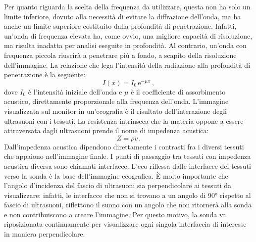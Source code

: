 \documentclass{report}
\numberwithin{equation}{section}
\numberwithin{figure}{section}
\begin{document}
Per quanto riguarda la scelta della frequenza da utilizzare, questa non ha solo un limite inferiore, dovuto alla necessità di evitare la diffrazione dell'onda, ma ha anche un limite superiore costituito dalla profondità di penetrazione. Infatti, un'onda di frequenza elevata ha, come ovvio, una migliore capacità di risoluzione, ma risulta inadatta per analisi eseguite in profondità. Al contrario, un'onda con frequenza piccola riuscirà a penetrare più a fondo, a scapito della risoluzione dell'immagine. La relazione che lega l'intensità della radiazione alla profondità di penetrazione è la seguente:
\begin{equation}
    I(x) = I_0\,\mathrm{e}^{-\mu x}\,,
    \label{mu}
\end{equation}
dove $I_0$ è l'intensità iniziale dell'onda e $\mu$ è il coefficiente di assorbimento acustico, direttamente proporzionale alla frequenza dell'onda. L’immagine visualizzata sul monitor in un'ecografia è il risultato dell'interazione degli ultrasuoni con i tessuti. La resistenza intrinseca che la materia oppone a essere attraversata dagli ultrasuoni prende il nome di impedenza acustica:
\begin{equation}
    Z = \rho v\,.
\end{equation}
Dall'impedenza acustica dipendono direttamente i contrasti fra i diversi tessuti che appaiono nell'immagine finale. I punti di passaggio tra tessuti con impedenza acustica diversa sono chiamati interfacce. L’eco riflessa dalle interfacce dei tessuti verso la sonda è la base dell'immagine ecografica. È molto importante che l’angolo d’incidenza del fascio di ultrasuoni sia perpendicolare ai tessuti da visualizzare: infatti, le interfacce che non si trovano a un angolo di 90° rispetto al fascio di ultrasuoni, riflettono il suono con un angolo che non ritornerà alla sonda e non contribuiscono a creare l’immagine. Per questo motivo, la sonda va riposizionata continuamente per visualizzare ogni singola interfaccia di interesse in maniera perpendicolare.
\end{document}
